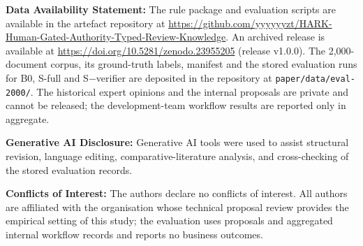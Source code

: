 \documentclass[computers,article,submit,moreauthors]{Definitions/mdpi}
\begin{document}
\noindent\textbf{Data Availability Statement:} The rule package and evaluation scripts are available in the artefact repository at \url{https://github.com/yyyyyyzt/HARK-Human-Gated-Authority-Typed-Review-Knowledge}. An archived release is available at \href{https://doi.org/10.5281/zenodo.23955205}{https://doi.org/10.5281/zenodo.23955205} (release v1.0.0). The 2,000-document corpus, its ground-truth labels, manifest and the stored evaluation runs for B0, S-full and S$-$verifier are deposited in the repository at \texttt{paper/data/eval-2000/}. The historical expert opinions and the internal proposals are private and cannot be released; the development-team workflow results are reported only in aggregate.

\noindent\textbf{Generative AI Disclosure:} Generative AI tools were used to assist structural revision, language editing, comparative-literature analysis, and cross-checking of the stored evaluation records. 

\noindent\textbf{Conflicts of Interest:} The authors declare no conflicts of interest. All authors are affiliated with the organisation whose technical proposal review provides the empirical setting of this study; the evaluation uses proposals and aggregated internal workflow records and reports no business outcomes.

\end{document}
